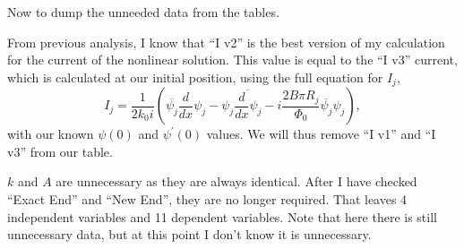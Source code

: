 \documentclass[11pt]{article}
\begin{document}
    Now to dump the unneeded data from the tables.

From previous analysis, I know that ``I v2'' is the best version of my
calculation for the current of the nonlinear solution. This value is
equal to the ``I v3'' current, which is calculated at our initial
position, using the full equation for \(I_j\), \begin{equation}
I_j = \frac{1}{2 k_0 i}\left( \overline{\psi_j} \frac{d}{dx} \psi_j -\psi_j \overline{\frac{d}{dx} \psi_j} -i \frac{2 B \pi R_j}{\Phi_0} \overline{\psi_j}  \psi_j  \right),
\end{equation} with our known \(\psi(0)\) and \(\psi^\prime(0)\) values.
We will thus remove ``I v1'' and ``I v3'' from our table.

\(k\) and \(A\) are unnecessary as they are always identical. After I
have checked ``Exact End'' and ``New End'', they are no longer required.
That leaves 4 independent variables and 11 dependent variables. Note
that here there is still unnecessary data, but at this point I don't
know it is unnecessary.
\end{document}
